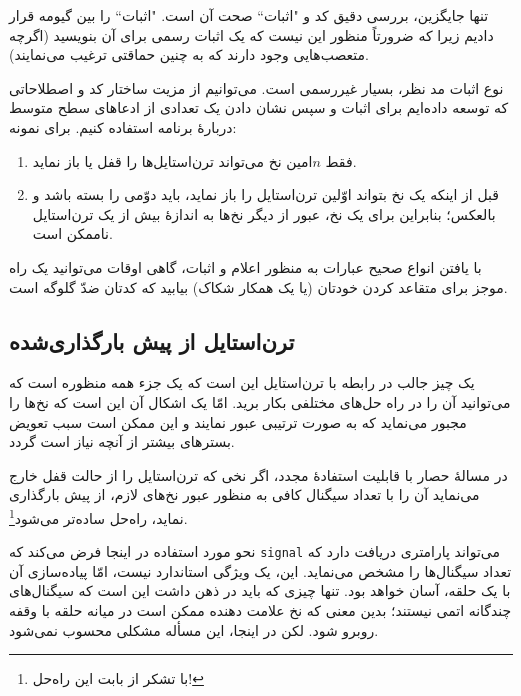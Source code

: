 \documentclass{book}
\newcommand{\clearemptydoublepage}{\newpage\cleardoublepage}
\begin{document}
    تنها جایگزین، بررسی دقیق کد و "اثبات`` صحت آن است. "اثبات`` را بین گیومه قرار دادیم زیرا که ضرورتاً منظور این نیست که یک اثبات 
    رسمی برای آن بنویسید (اگرچه متعصب‌هایی وجود دارند که به چنین حماقتی  ترغیب می‌نمایند).

نوع اثبات مد نظر، بسیار غیررسمی است. می‌توانیم از مزیت ساختار کد و اصطلاحاتی که توسعه داده‌ایم برای اثبات و سپس نشان دادن 
یک تعدادی از ادعاهای سطح متوسط دربارهٔ برنامه استفاده کنیم. برای نمونه:


    
\begin{enumerate}

\item 
    فقط $n$امین نخ می‌تواند ترن‌استایل‌ها را قفل یا باز نماید. 

\item 
    قبل از اینکه یک نخ بتواند اوّلین ترن‌استایل را باز نماید، باید دوّمی را بسته باشد و بالعکس؛‌ بنابراین برای یک نخ، عبور از دیگر نخ‌ها به اندازهٔ بیش از 
    یک تر‌ن‌استایل ناممکن است. 

\end{enumerate}

    با یافتن انواع صحیح عبارات به منظور اعلام و اثبات، گاهی اوقات می‌توانید یک راه موجز برای متقاعد کردن خودتان  (یا یک همکار 
    شکاک) بیابید که کدتان ضدّ  گلوگه است. 
    

\clearemptydoublepage
\subsection { ترن‌استایل از پیش بارگذاری‌شده}

    یک چیز جالب در رابطه با ترن‌استایل این است که یک جزء همه منظوره است که می‌توانید آن را در راه حل‌های مختلفی بکار برید. 
    امّا یک اشکال آن این است که نخ‌ها را مجبور می‌نماید که به صورت ترتیبی عبور نمایند و این ممکن است سبب 
    تعویض بسترهای بیشتر از آنچه نیاز است گردد.

    در مسالهٔ حصار با قابلیت استفادهٔ مجدد، اگر نخی که ترن‌استایل را از حالت قفل خارج می‌نماید 
    آن را با تعداد سیگنال کافی به منظور عبور نخ‌های لازم، از پیش بارگذاری نماید، راه‌حل ساده‌تر می‌شود\footnote{با تشکر از  بابت این راه‌حل!}. 

    نحو مورد استفاده در اینجا فرض می‌کند که \texttt{signal} می‌تواند پارامتری دریافت دارد که تعداد سیگنال‌ها را مشخص می‌نماید. 
    این، یک ویژگی استاندارد نیست، امّا پیاده‌سازی آن با یک حلقه، آسان خواهد بود. تنها چیزی که باید در ذهن داشت این است که سیگنال‌های چندگانه 
    اتمی نیستند؛ بدین معنی که نخ علامت دهنده ممکن است در میانه حلقه با وقفه روبرو شود. لکن در اینجا، این مسأله مشکلی محسوب نمی‌شود.
\end{document}
